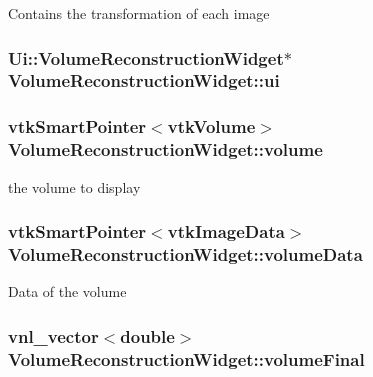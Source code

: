 Contains the transformation of each image \hypertarget{class_volume_reconstruction_widget_afe330d72d1167607d761a6be7f5c4048}{
\subsubsection[{ui}]{\setlength{\rightskip}{0pt plus 5cm}Ui\-::\-Volume\-Reconstruction\-Widget$\ast$ {\bf Volume\-Reconstruction\-Widget\-::ui}}}\label{d5/d55/class_volume_reconstruction_widget_afe330d72d1167607d761a6be7f5c4048}
\hypertarget{class_volume_reconstruction_widget_a40d53f5d382c03ff1ea33531f0c90394}{
\subsubsection[{volume}]{\setlength{\rightskip}{0pt plus 5cm}vtk\-Smart\-Pointer$<$vtk\-Volume$>$ {\bf Volume\-Reconstruction\-Widget\-::volume}}}\label{d5/d55/class_volume_reconstruction_widget_a40d53f5d382c03ff1ea33531f0c90394}
the volume to display \hypertarget{class_volume_reconstruction_widget_a88b81c92ab3f640a7e1e9f8bbf40a2ba}{
\subsubsection[{volume\-Data}]{\setlength{\rightskip}{0pt plus 5cm}vtk\-Smart\-Pointer$<$vtk\-Image\-Data$>$ {\bf Volume\-Reconstruction\-Widget\-::volume\-Data}}}\label{d5/d55/class_volume_reconstruction_widget_a88b81c92ab3f640a7e1e9f8bbf40a2ba}
Data of the volume \hypertarget{class_volume_reconstruction_widget_abb6e7b4895b0a9e6b60419b432b9afcb}{
\subsubsection[{volume\-Final}]{\setlength{\rightskip}{0pt plus 5cm}vnl\-\_\-vector$<$double$>$ {\bf Volume\-Reconstruction\-Widget\-::volume\-Final}}}\label{d5/d55/class_volume_reconstruction_widget_abb6e7b4895b0a9e6b60419b432b9afcb}
